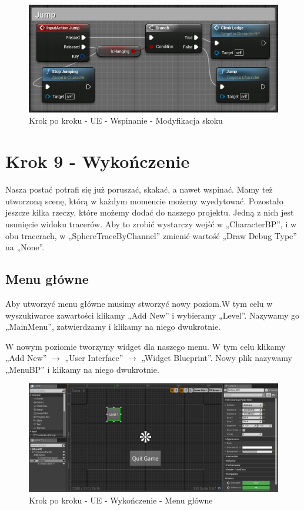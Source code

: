 \documentclass[openright]{xmgr}
\begin{document}
\begin{figure}[!htb]
    \begin{center}
    \includegraphics[scale=0.5]{Screeny/UeKrokPoKroku/JumpClimb}
    \end{center}
    \caption{Krok po kroku - UE - Wspinanie - Modyfikacja skoku}
\end{figure}

\section{Krok 9 - Wykończenie}

Nasza postać potrafi się już poruszać, skakać, a nawet wspinać. Mamy też utworzoną scenę, którą w każdym momencie możemy wyedytować. Pozostało jeszcze kilka rzeczy, które możemy dodać do naszego projektu. Jedną z nich jest usunięcie widoku tracerów. Aby to zrobić wystarczy wejść w „CharacterBP”, i w obu tracerach, w „SphereTraceByChannel” zmienić wartość „Draw Debug Type” na „None”.

\subsection{Menu główne}

Aby utworzyć menu główne musimy stworzyć nowy poziom.W tym celu w wyszukiwarce zawartości klikamy „Add New” i wybieramy „Level”. Nazywamy go „MainMenu”, zatwierdzamy i klikamy na niego dwukrotnie. 

W nowym poziomie tworzymy widget dla naszego menu. W tym celu klikamy „Add New” $\rightarrow$ „User Interface” $\rightarrow$ „Widget Blueprint”. Nowy plik nazywamy „MenuBP” i klikamy na niego dwukrotnie.

\begin{figure}[!htb]
    \begin{center}
    \includegraphics[scale=0.35]{Screeny/UeKrokPoKroku/MainMenu}
    \end{center}
    \caption{Krok po kroku - UE - Wykończenie - Menu główne}
\end{figure}
\end{document}
